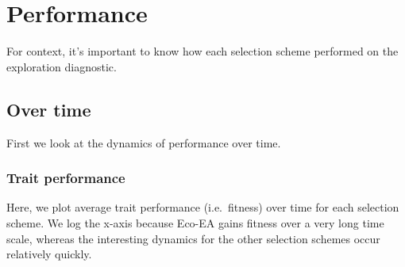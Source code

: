 \documentclass[]{book}
\begin{document}
\hypertarget{performance}{%
\section{Performance}\label{performance}}

For context, it's important to know how each selection scheme performed on the exploration diagnostic.

\hypertarget{over-time}{%
\subsection{Over time}\label{over-time}}

First we look at the dynamics of performance over time.

\hypertarget{trait-performance}{%
\subsubsection{Trait performance}\label{trait-performance}}

Here, we plot average trait performance (i.e.~fitness) over time for each selection scheme. We log the x-axis because Eco-EA gains fitness over a very long time scale, whereas the interesting dynamics for the other selection schemes occur relatively quickly.
\end{document}
